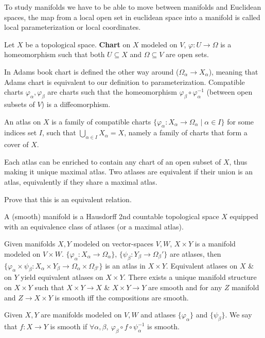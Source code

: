 To study manifolds we have to be able to move between manifolds and Euclidean spaces, the map from a local open set in euclidean space into a manifold is called local parameterization or local coordinates.
\begin{definition}[Chart]
	Let $X$ be a topological space.
	\textbf{Chart} on $X$ modeled on $V$, $\varphi : U \to \Omega$ is a homeomorphism such that both $U \subseteq X$ and $\Omega \subseteq V$ are open sets.
\end{definition}
In Adams book chart is defined the other way around ($\Omega_{\alpha} \to X_{\alpha}$), meaning that Adams chart is equivalent to our definition to parameterization.
Compatible charts $\varphi_{\alpha}, \varphi_{\beta}$ are charts such that the homeomorphism $\varphi_{\beta} \circ \varphi_{\alpha}^{-1}$ (between open subsets of $V$) is a diffeomorphism.
\begin{definition}[Atlas]
	An atlas on $X$ is a family of compatible charts $\{ \varphi_{\alpha} : X_{\alpha} \to \Omega_{\alpha} \mid \alpha \in I \}$ for some indices set $I$,
	such that $\bigcup_{\alpha \in I} X_{\alpha} = X$, namely a family of charts that form a cover of $X$.
\end{definition}
Each atlas can be enriched to contain any chart of an open subset of $X$, thus making it unique maximal atlas.
Two atlases are equivalent if their union is an atlas, equivalently if they share a maximal atlas.
\begin{exercise}
	Prove that this is an equivalent relation.
\end{exercise}
\begin{definition}
	A (smooth) manifold is a Hausdorff 2nd countable topological space $X$ equipped with an equivalence class of atlases (or a maximal atlas).
\end{definition}
Given manifolds $X, Y$ modeled on vector-spaces $V, W$, $X \times Y$ is a manifold modeled on $V \times W$.
$\{ \varphi_{\alpha} : X_{\alpha} \to \Omega_{\alpha} \}$, $\{ \psi_{\beta} : Y_{\beta} \to \Omega_{\beta}' \}$ are atlases,
then $\{ \varphi_{\alpha} \times \psi_{\beta} : X_{\alpha} \times Y_{\beta} \to \Omega_{\alpha} \times \Omega_{\beta'} \}$ is an atlas in $X \times Y$.
Equivalent atlases on $X$ \& on $Y$  yield equivalent atlases on $X \times Y$.
There exists a unique manifold structure on $X \times Y$ such that $X \times Y \to X$ \& $X \times Y \to Y$ are smooth and for any $Z$ manifold and $Z \to X \times Y$ is smooth iff the compositions are smooth.
\begin{definition}
	Given $X, Y$ are manifolds modeled on $V, W$ and atlases $\{ \varphi_{\alpha} \}$ and $\{ \psi_{\beta} \}$.
	We say that $f : X \to Y$ is smooth if $\forall \alpha, \beta,\ \varphi_{\beta} \circ f \circ \psi_{\alpha}^{-1}$ is smooth.
\end{definition}
